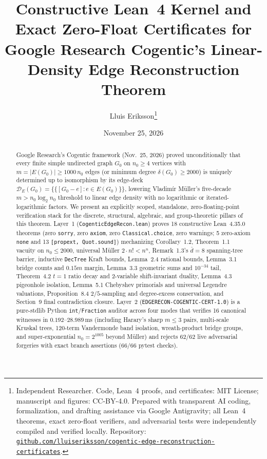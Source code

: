 \documentclass[10pt,twocolumn]{article}
\title{\vspace{-0.9em}\textbf{Constructive Lean~4 Kernel and Exact Zero-Float Certificates for Google Research Cogentic's Linear-Density Edge Reconstruction Theorem}}
\author{Lluis Eriksson\thanks{Independent Researcher. Code, Lean~4 proofs, and certificates: MIT License; manuscript and figures: CC-BY-4.0. Prepared with transparent AI coding, formalization, and drafting assistance via Google Antigravity; all Lean~4 theorems, exact zero-float verifiers, and adversarial tests were independently compiled and verified locally. Repository: \href{https://github.com/lluiseriksson/cogentic-edge-reconstruction-certificates}{\nolinkurl{github.com/lluiseriksson/cogentic-edge-reconstruction-certificates}}.}}
\date{November 25, 2026}
\begin{document}
\maketitle
\vspace{-1.2em}

\begin{abstract}
Google Research's Cogentic framework (Nov.~25, 2026) proved unconditionally that every finite simple undirected graph $G_0$ on $n_0 \ge 4$ vertices with $m = |E(G_0)| \ge 1000\,n_0$ edges (or minimum degree $\delta(G_0) \ge 2000$) is uniquely determined up to isomorphism by its edge-deck $\mathcal{D}_E(G_0) = \{\{[G_0 - e] : e\in E(G_0)\}\}$, lowering Vladim\'ir M\"uller's five-decade $m > n_0\log_2 n_0$ threshold to linear edge density with no logarithmic or iterated-logarithmic factors. We present an explicitly scoped, standalone, zero-floating-point verification stack for the discrete, structural, algebraic, and group-theoretic pillars of this theorem. Layer~1 (\nolinkurl{CogenticEdgeRecon.lean}) proves 18 constructive Lean~4.35.0 theorems (zero \texttt{sorry}, zero \texttt{axiom}, zero \texttt{Classical.choice}, zero warnings; 5 zero-axiom \texttt{none} and 13 \texttt{[propext, Quot.sound]}) mechanizing Corollary~1.2, Theorem~1.1 vacuity on $n_0\le 2000$, universal M\"uller $2\cdot n! < n^n$, Remark~1.3's $\bar{d}=8$ spanning-tree barrier, inductive \texttt{DecTree} Kraft bounds, Lemma~2.4 rational bounds, Lemma~3.1 bridge counts and $0.15m$ margin, Lemma~3.3 geometric sums and $10^{-34}$ tail, Theorem~4.2 $t{=}1$ ratio decay and 2-variable shift-invariant duality, Lemma~4.3 pigeonhole isolation, Lemma~5.1 Chebyshev primorials and universal Legendre valuations, Proposition~8.4 $2/5$-sampling and degree-excess conservation, and Section~9 final contradiction closure. Layer~2 (\nolinkurl{EDGERECON-COGENTIC-CERT-1.0}) is a pure-stdlib Python \texttt{int}/\texttt{Fraction} auditor across four modes that verifies 16 canonical witnesses in $0.192$--$28.989\,\mathrm{ms}$ (including Harary's sharp $m\le 3$ pairs, multi-scale Kruskal trees, 120-term Vandermonde band isolation, wreath-product bridge groups, and super-exponential $n_0 = 2^{1005}$ beyond M\"uller) and rejects 62/62 live adversarial forgeries with exact branch assertions (66/66 pytest checks).
\end{abstract}
\end{document}
